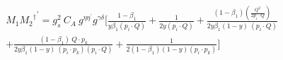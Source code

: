 %
%
%
%

\begin{equation}
\begin{split}
&{M_1{M_2}^{\dagger}}^{\prime}=g_s^2\: C_A\:g^{{{\eta}}{{\eta}^{\prime}}}g^{{{\gamma}}{{\delta}}}[\frac{1-\beta_1}{y\beta_1 (p_i \cdot Q)}+\frac{1}{2y(p_i \cdot Q)}+\frac{(1-\beta_1)(\frac{Q^2}{2p_i \cdot Q})}{2y\beta_1 (1-y)\:(p_i \cdot Q)}\\
&+\frac{(1-\beta_1)\:Q\cdot p_k}{2y\beta_1 (1-y)\:(p_i \cdot p_k)(p_i \cdot Q)}+\frac{1}{2(1-\beta_1)(1-y) (p_i \cdot p_k)}]\\
\end{split}
\end{equation}

